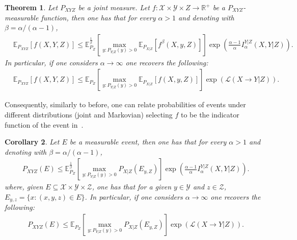 \documentclass{article}
\newtheorem{theorem}{Theorem}
\numberwithin{theorem}{section}
\newtheorem{corollary}[theorem]{Corollary}
\numberwithin{example}{section}
\numberwithin{remark}{section}
\numberwithin{definition}{section}
\newcommand{\X}{\mathcal{X}}
\newcommand{\Y}{\mathcal{Y}}
\newcommand{\ml}[2]{\mathcal{L}\left(#1  \!\!  \to  \!\!   #2\right)} %
\begin{document}
\begin{theorem}\label{thm:functionBoundCondIalpha}
    Let $P_{XYZ}$ be a joint measure. Let $f:\X\times\Y\times Z \to\mathbb{R}^+$ be a $P_{XYZ}$-measurable function, then one has that for every $\alpha>1$ and denoting with $\beta=\alpha/(\alpha-1)$,
    \begin{equation}
    \begin{split}
        &\mathbb{E}_{P_{XYZ}}\left[f(X,Y,Z)\right]\leq\mathbb{E}^\frac{1}{\beta}_{P_Z}\left[\max_{y:P_{Y|Z}(y)>0} \mathbb{E}_{P_{X|Z}}\left[f^\beta(X,y,Z)\right]\right]\exp\left(\frac{\alpha-1}{\alpha}I^{Y|Z}_\alpha(X,Y|Z)\right).  
    \end{split}
    \end{equation}
    In particular, if one considers $\alpha\to\infty$ one recovers the following:
       \begin{equation}
       \begin{split}
      &\mathbb{E}_{P_{XYZ}}\left[f(X,Y,Z)\right]
            \leq\mathbb{E}_{P_Z}\left[\max_{y:P_{Y|Z}(y)>0} \mathbb{E}_{P_{X|Z}}\left[f(X,y,Z)\right]\right]\exp\left(\ml{X}{Y|Z}\right). 
       \end{split}
    \end{equation}
\end{theorem}

Consequently, similarly to before, one can relate probabilities of events under different distributions (joint and Markovian) selecting $f$ to be the indicator function of the event in~.
\begin{corollary}\label{thm:probBoundConditionalIalpha}
    Let $E$ be a measurable event, then one has that for every $\alpha>1$ and denoting with $\beta=\alpha/(\alpha-1)$,
    \begin{equation}
    \begin{split}
        &P_{XYZ}(E) \leq \mathbb{E}^\frac{1}{\beta}_{P_Z}\left[\max_{y:P_{Y|Z}(y)>0}P_{X|Z}(E_{y,Z})\right]\exp\left(\frac{\alpha-1}{\alpha}I_\alpha^{Y|Z}(X,Y|Z)\right).
    \end{split}
    \end{equation}
     where, given $E\subseteq \X\times\Y\times \mathcal{Z}$, one has that for a given $y\in\Y$ and $z\in\mathcal{Z}$, $E_{y,z}=\{x:(x,y,z)\in E\}$.
    In particular, if one considers $\alpha\to\infty$ one recovers the following:
    \begin{equation}
    \begin{split}
        &P_{XYZ}(E) \leq \mathbb{E}_{P_Z}\left[\max_{y:P_{Y|Z}(y)>0}P_{X|Z}(E_{y,Z})\right]\exp\left(\ml{X}{Y|Z}\right).
    \end{split}
    \end{equation}
\end{corollary}
\end{document}
